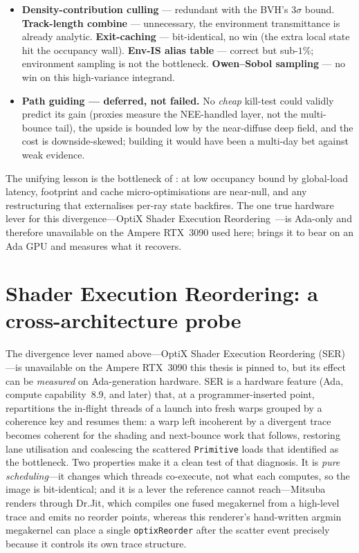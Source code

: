 \begin{itemize}
  folds the analytic transmittance at all bounces is the open direction should the flat gap ever matter.
  \item \textbf{Density-contribution culling} --- redundant with the BVH's $3\sigma$ bound.
  \textbf{Track-length combine} --- unnecessary, the environment transmittance is already
  analytic. \textbf{Exit-caching} --- bit-identical, no win (the extra local state hit the
  occupancy wall). \textbf{Env-IS alias table} --- correct but sub-$1\%$; environment sampling
  is not the bottleneck. \textbf{Owen--Sobol sampling} --- no win on this high-variance
  integrand.
  \item \textbf{Path guiding --- deferred, not failed.} No \emph{cheap} kill-test could
  validly predict its gain (proxies measure the NEE-handled layer, not the multi-bounce tail), the
  upside is bounded low by the near-diffuse deep field, and the cost is downside-skewed; building it
  would have been a multi-day bet against weak evidence.
\end{itemize}

The unifying lesson is the bottleneck of : at low occupancy bound by global-load
latency, footprint and cache micro-optimisations are near-null, and any restructuring that externalises
per-ray state backfires. The one true hardware lever for this divergence---OptiX Shader Execution
Reordering~\cite{NvidiaSER2022}---is Ada-only and therefore unavailable on the Ampere RTX~3090 used here;
 brings it to bear on an Ada GPU and measures what it recovers.

\section{Shader Execution Reordering: a cross-architecture probe}
\label{sec:ser}

The divergence lever named above---OptiX Shader Execution Reordering (SER)---is unavailable on the
Ampere RTX~3090 this thesis is pinned to, but its effect can be \emph{measured} on Ada-generation
hardware. SER is a hardware feature (Ada, compute capability~8.9, and later) that, at a
programmer-inserted point, repartitions the in-flight threads of a launch into fresh warps grouped by a
coherence key and resumes them: a warp left incoherent by a divergent trace becomes coherent for the
shading and next-bounce work that follows, restoring lane utilisation and coalescing the scattered
\texttt{Primitive} loads that  identified as the bottleneck. Two properties make it
a clean test of that diagnosis. It is \emph{pure scheduling}---it changes which threads co-execute, not
what each computes, so the image is bit-identical; and it is a lever the reference cannot reach---Mitsuba
renders through Dr.Jit, which compiles one fused megakernel from a high-level trace and emits no reorder
points, whereas this renderer's hand-written argmin megakernel can place a single \texttt{optixReorder}
after the scatter event precisely because it controls its own trace structure.

